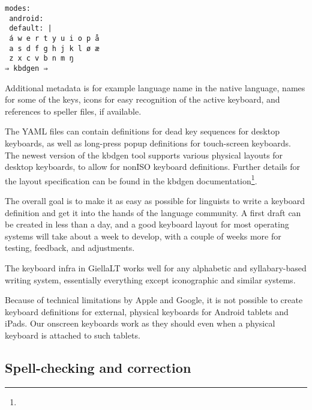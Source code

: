 \documentclass[free]{flammie}
\begin{document}
\begin{verbatim}
modes:
 android:
 default: |
 á w e r t y u i o p å
 a s d f g h j k l ø æ
 z x c v b n m ŋ
⇒ kbdgen ⇒
\end{verbatim}

Additional metadata is for example language name in the native language, names for some
of the keys, icons for easy recognition of the active keyboard, and references to speller
files, if available.

The YAML files can contain definitions for dead key sequences for desktop keyboards,
as well as long-press popup definitions for touch-screen keyboards. The newest version of
the kbdgen tool supports various physical layouts for desktop keyboards, to allow for nonISO keyboard definitions. Further details for the layout specification can be found in the
kbdgen documentation\footnote{}.

The overall goal is to make it as easy as possible for linguists to write a keyboard definition and get it into the hands of the language community. A first draft can be created in
less than a day, and a good keyboard layout for most operating systems will take about a
week to develop, with a couple of weeks more for testing, feedback, and adjustments.

The keyboard infra in GiellaLT works well for any alphabetic and syllabary-based writing system, essentially everything except iconographic and similar systems.

Because of technical limitations by Apple and Google, it is not possible to create keyboard definitions for external, physical keyboards for Android tablets and iPads. Our onscreen keyboards work as they should even when a physical keyboard is attached to such
tablets.

\subsection{Spell-checking and correction}
\end{document}
